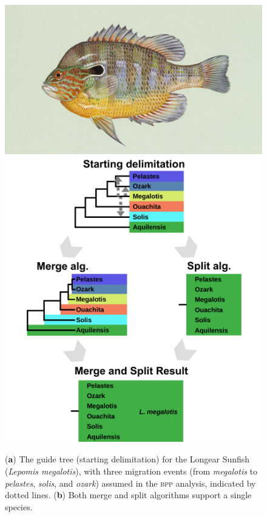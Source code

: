 \documentclass{article1}
\newcommand{\red}[1]{{\color{red}{#1}}}
\newcommand{\blue}[1]{{\color{blue}{#1}}}
\begin{document}
\begin{figure}[t]
    \centering %
    \includegraphics[scale=0.15]{figs/Sunfish/Lepomis_megalotis} %
    \includegraphics[scale=0.45]{figs/Sunfish/sunfish_results} %
    
    \caption{(\textbf{a}) The guide tree (starting delimitation) for the Longear Sunfish
    (\textit{Lepomis megalotis}), with three migration events (from \textit{megalotis} to
    \textit{pelastes}, \textit{solis}, and \textit{ozark}) assumed in the \textsc{bpp}
    analysis, indicated by dotted lines.  %
    (\textbf{b}) Both merge and split algorithms support a single species.  \red{[show
    merge result, as in figures for the other datasets.  We need care to detail, and
    consistency among datasets.]}\blue{[merge and split results are identical, updated figure subtitles to reflect this]}%
    } \label{fig:sunfish}
\end{figure}
\end{document}
